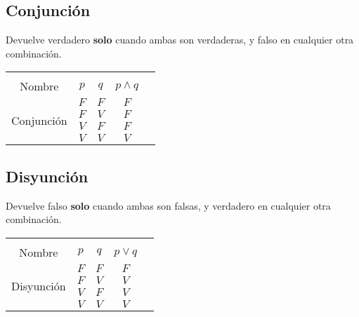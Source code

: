 \documentclass[12pt, fleqn]{report}                             %
\begin{document}
            \subsection{Conjunción}

                Devuelve verdadero \textbf{solo} cuando ambas son verdaderas, y falso en cualquier
                otra combinación.\\

                \begin{tabular}{ |c|c|c|c|c| } 
                    \hline &&&\\
                    \large{Nombre} & $p$ & $q$ & $p \land q$ \\[0.5em]
                    \hline
                    \multirow{4}{5em}{Conjunción}
                    & $F$ & $F$ & $F$ \\ \cline{2-4}
                    & $F$ & $V$ & $F$ \\ \cline{2-4}
                    & $V$ & $F$ & $F$ \\ \cline{2-4}
                    & $V$ & $V$ & $V$ \\ 
                    \hline
                \end{tabular}


            \subsection{Disyunción}

                Devuelve falso \textbf{solo} cuando ambas son falsas, y verdadero en cualquier
                otra combinación.\\

                \begin{tabular}{ |c|c|c|c|c| } 
                    \hline &&&\\
                    \large{Nombre} & $p$ & $q$ & $p \lor q$ \\[0.5em]
                    \hline
                    \multirow{4}{5em}{Disyunción}
                    & $F$ & $F$ & $F$ \\ \cline{2-4}
                    & $F$ & $V$ & $V$ \\ \cline{2-4}
                    & $V$ & $F$ & $V$ \\ \cline{2-4}
                    & $V$ & $V$ & $V$ \\ 
                    \hline
                \end{tabular}
\end{document}
